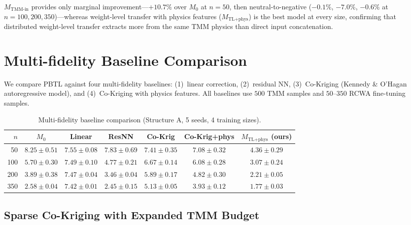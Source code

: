 \documentclass[11pt]{article}
\newcommand{\Mzero}{\ensuremath{M_0}}
\newcommand{\Mtlphys}{\ensuremath{M_\text{TL+phys}}}
\begin{document}
$M_\text{TMM-in}$ provides only marginal improvement---$+10.7\%$ over $\Mzero$ at $n{=}50$, then neutral-to-negative ($-0.1\%$, $-7.0\%$, $-0.6\%$ at $n{=}100,200,350$)---whereas weight-level transfer with physics features ($\Mtlphys$) is the best model at every size, confirming that distributed weight-level transfer extracts more from the same TMM physics than direct input concatenation.


\section{Multi-fidelity Baseline Comparison}
\label{sec:si_mf}

We compare PBTL against four multi-fidelity baselines: (1)~linear correction, (2)~residual NN, (3)~Co-Kriging (Kennedy \& O'Hagan autoregressive model), and (4)~Co-Kriging with physics features. All baselines use $500$ TMM samples and $50$--$350$ RCWA fine-tuning samples.

\begin{table}[htbp]\centering\small
\caption{Multi-fidelity baseline comparison (Structure A, 5 seeds, 4 training sizes).}
\label{tab:multifidelity_baselines}
\begin{tabular}{r ccccc c}\toprule
$n$ & $\Mzero$ & Linear & ResNN & Co-Krig & Co-Krig+phys & $\Mtlphys$ (ours)\\\midrule
50  & $8.25 \pm 0.51$ & $7.55 \pm 0.08$ & $7.83 \pm 0.69$ & $7.41 \pm 0.35$ & $7.08 \pm 0.32$ & $\mathbf{4.36 \pm 0.29}$\\
100 & $5.70 \pm 0.30$ & $7.49 \pm 0.10$ & $4.77 \pm 0.21$ & $6.67 \pm 0.14$ & $6.08 \pm 0.28$ & $\mathbf{3.07 \pm 0.24}$\\
200 & $3.89 \pm 0.38$ & $7.47 \pm 0.04$ & $3.46 \pm 0.04$ & $5.89 \pm 0.17$ & $4.82 \pm 0.30$ & $\mathbf{2.21 \pm 0.05}$\\
350 & $2.58 \pm 0.04$ & $7.42 \pm 0.01$ & $2.45 \pm 0.15$ & $5.13 \pm 0.05$ & $3.93 \pm 0.12$ & $\mathbf{1.77 \pm 0.03}$\\\bottomrule
\end{tabular}
\end{table}

\subsection*{Sparse Co-Kriging with Expanded TMM Budget}
\end{document}

